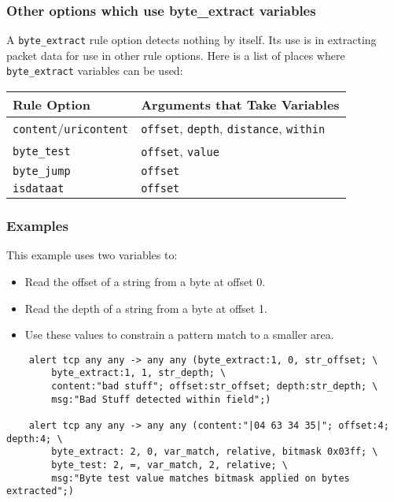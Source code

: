 \documentclass[english]{report}
\begin{document}
\subsubsection{Other options which use byte\_extract variables}

A \texttt{byte\_extract} rule option detects nothing by itself. Its use is in
extracting packet data for use in other rule options. Here is a list of places
where \texttt{byte\_extract} variables can be used:

\begin{tabular}{| l | p{4.5in} |}
\hline
{\bf Rule Option} & {\bf Arguments that Take Variables}\\
\hline
\hline
\texttt{content}/\texttt{uricontent} & \texttt{offset}, \texttt{depth},
\texttt{distance}, \texttt{within}\\
\hline
\texttt{byte\_test} & \texttt{offset}, \texttt{value}\\
\hline
\texttt{byte\_jump} & \texttt{offset}\\
\hline
\texttt{isdataat} & \texttt{offset}\\
\hline
\end{tabular}

\subsubsection{Examples}

This example uses two variables to:
\begin{itemize}
\item Read the offset of a string from a byte at offset 0.
\item Read the depth of a string from a byte at offset 1.
\item Use these values to constrain a pattern match to a smaller area.
\end{itemize}

\begin{verbatim}
    alert tcp any any -> any any (byte_extract:1, 0, str_offset; \
        byte_extract:1, 1, str_depth; \
        content:"bad stuff"; offset:str_offset; depth:str_depth; \
        msg:"Bad Stuff detected within field";)

    alert tcp any any -> any any (content:"|04 63 34 35|"; offset:4; depth:4; \
        byte_extract: 2, 0, var_match, relative, bitmask 0x03ff; \
        byte_test: 2, =, var_match, 2, relative; \
        msg:"Byte test value matches bitmask applied on bytes extracted";)
\end{verbatim}
\end{document}
